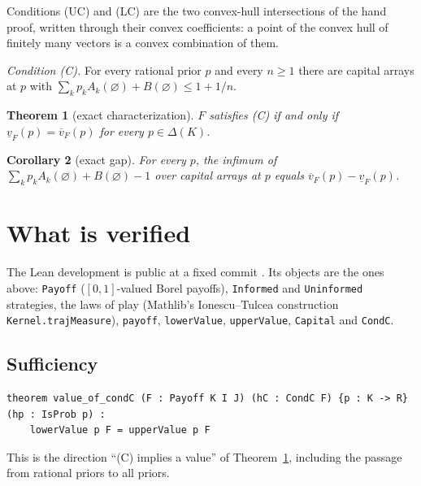 \documentclass[11pt]{article}
\newtheorem{theorem}{Theorem}
\newtheorem{corollary}[theorem]{Corollary}
\theoremstyle{definition}
\newcommand{\lv}{\underline v}
\newcommand{\uv}{\overline v}
\begin{document}
Conditions (UC) and (LC) are the two convex-hull intersections of the hand proof, written through their convex coefficients: a point of the convex hull of finitely many vectors is a convex combination of them.

\emph{Condition (C).} For every rational prior $p$ and every $n\ge1$ there are capital arrays at $p$ with $\sum_k p_kA_k(\varnothing)+B(\varnothing)\le1+1/n$.

\begin{theorem}[exact characterization]\label{main}
$F$ satisfies (C) if and only if $\lv_F(p)=\uv_F(p)$ for every $p\in\Delta(K)$.
\end{theorem}

\begin{corollary}[exact gap]\label{gap}
For every $p$, the infimum of $\sum_kp_kA_k(\varnothing)+B(\varnothing)-1$ over capital arrays at $p$ equals $\uv_F(p)-\lv_F(p)$.
\end{corollary}

\section{What is verified}

The Lean development is public at a fixed commit \cite{Lean}. Its objects are the ones above: \texttt{Payoff} ($[0,1]$-valued Borel payoffs), \texttt{Informed} and \texttt{Uninformed} strategies, the laws of play (Mathlib's Ionescu--Tulcea construction \texttt{Kernel.trajMeasure}), \texttt{payoff}, \texttt{lowerValue}, \texttt{upperValue}, \texttt{Capital} and \texttt{CondC}.

\subsection*{Sufficiency}
\begin{verbatim}
theorem value_of_condC (F : Payoff K I J) (hC : CondC F) {p : K -> R} (hp : IsProb p) :
    lowerValue p F = upperValue p F
\end{verbatim}
This is the direction ``(C) implies a value'' of Theorem~\ref{main}, including the passage from rational priors to all priors.
\end{document}
